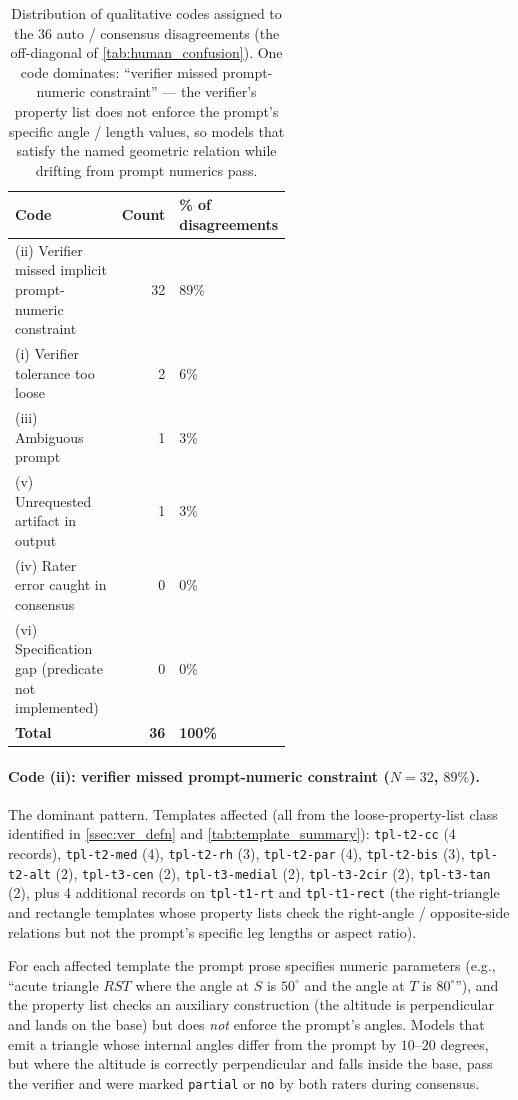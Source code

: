 \begin{table}[t]
\caption{Distribution of qualitative codes assigned to the $36$ auto / consensus disagreements (the off-diagonal of \cref{tab:human_confusion}). One code dominates: ``verifier missed prompt-numeric constraint'' --- the verifier's property list does not enforce the prompt's specific angle / length values, so models that satisfy the named geometric relation while drifting from prompt numerics pass.}
\label{tab:disagreement_codes}
\centering
\small
\begin{tabular}{p{0.55\linewidth}rl}
\toprule
\textbf{Code} & \textbf{Count} & \textbf{\% of disagreements} \\
\midrule
(ii) Verifier missed implicit prompt-numeric constraint
  & 32 & 89\% \\
(i) Verifier tolerance too loose
  & 2 & 6\% \\
(iii) Ambiguous prompt
  & 1 & 3\% \\
(v) Unrequested artifact in output
  & 1 & 3\% \\
(iv) Rater error caught in consensus
  & 0 & 0\% \\
(vi) Specification gap (predicate not implemented)
  & 0 & 0\% \\
\midrule
\textbf{Total} & \textbf{36} & \textbf{100\%} \\
\bottomrule
\end{tabular}
\end{table}

\paragraph{Code (ii): verifier missed prompt-numeric constraint ($N{=}32$, $89\%$).}
The dominant pattern.
Templates affected (all from the loose-property-list class identified in \cref{ssec:ver_defn} and \cref{tab:template_summary}):
\texttt{tpl-t2-cc} (4 records),
\texttt{tpl-t2-med} (4),
\texttt{tpl-t2-rh} (3),
\texttt{tpl-t2-par} (4),
\texttt{tpl-t2-bis} (3),
\texttt{tpl-t2-alt} (2),
\texttt{tpl-t3-cen} (2),
\texttt{tpl-t3-medial} (2),
\texttt{tpl-t3-2cir} (2),
\texttt{tpl-t3-tan} (2),
plus 4 additional records on \texttt{tpl-t1-rt} and \texttt{tpl-t1-rect} (the right-triangle and rectangle templates whose property lists check the right-angle / opposite-side relations but not the prompt's specific leg lengths or aspect ratio).

For each affected template the prompt prose specifies numeric parameters (e.g., ``acute triangle $RST$ where the angle at $S$ is $50^\circ$ and the angle at $T$ is $80^\circ$''), and the property list checks an auxiliary construction (the altitude is perpendicular and lands on the base) but does \emph{not} enforce the prompt's angles.
Models that emit a triangle whose internal angles differ from the prompt by $10$--$20$ degrees, but where the altitude is correctly perpendicular and falls inside the base, pass the verifier and were marked \texttt{partial} or \texttt{no} by both raters during consensus.

